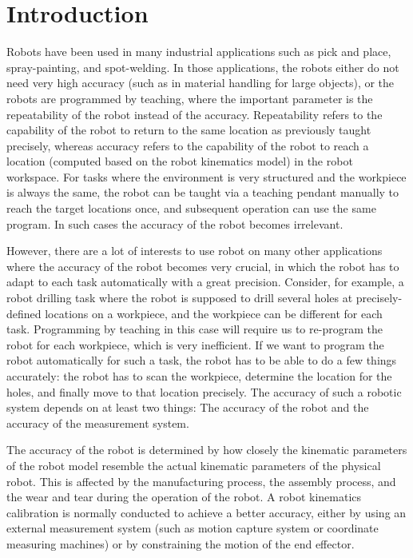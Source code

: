 \section{Introduction}
\label{sec:introduction}

Robots have been used in many industrial applications such as pick and place, spray-painting, and spot-welding. In those applications, the robots either do not need very high accuracy (such as in material handling for large objects), or the robots are programmed by teaching, where the important parameter is the repeatability of the robot instead of the accuracy. Repeatability refers to the capability of the robot to return to the same location as previously taught precisely, whereas accuracy refers to the capability of the robot to reach a location (computed based on the robot kinematics model) in the robot workspace. For tasks where the environment is very structured and the workpiece is always the same, the robot can be taught via a teaching pendant manually to reach the target locations once, and subsequent operation can use the same program. In such cases the accuracy of the robot becomes irrelevant. 

However, there are a lot of interests to use robot on many other applications where the accuracy of the robot becomes very crucial, in which the robot has to adapt to each task automatically with a great precision. Consider, for example, a robot drilling task where the robot is supposed to drill several holes at precisely-defined locations on a workpiece, and the workpiece can be different for each task. Programming by teaching in this case will require us to re-program the robot for each workpiece, which is very inefficient. If we want to program the robot automatically for such a task, the robot has to be able to do a few things accurately: the robot has to scan the workpiece, determine the location for the holes, and finally
move to that location precisely. The accuracy of such a robotic system depends on at least two things: The accuracy of the robot and the accuracy of the measurement system. 

The accuracy of the robot is determined by how closely the kinematic parameters of the robot model resemble the actual kinematic parameters of the physical robot. This is affected by the manufacturing process, the assembly process, and the wear and tear during the operation of the robot. A robot kinematics calibration is normally conducted to achieve a better accuracy, either by using an external measurement system (such as motion capture system or coordinate measuring machines) or by constraining the motion of the end effector.

